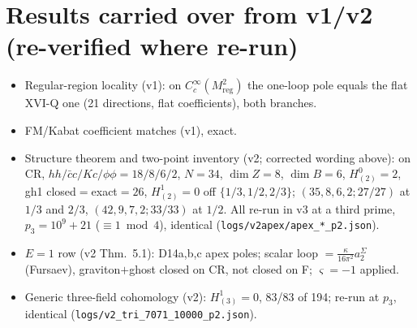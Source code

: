 \documentclass[11pt]{article}
\theoremstyle{definition}
\newcommand{\ka}{\kappa}
\newcommand{\Reg}{M_{\mathrm{reg}}}
\begin{document}
\section{Results carried over from v1/v2 (re-verified where re-run)}
\begin{itemize}
\item Regular-region locality (v1): on $C_c^\infty(\Reg^2)$ the one-loop pole equals the flat XVI-Q one (21 directions, flat coefficients), both branches.
\item FM/Kabat coefficient matches (v1), exact.
\item Structure theorem and two-point inventory (v2; corrected wording above): on CR, $hh/\bar cc/Kc/\phi\phi=18/8/6/2$, $N=34$, $\dim Z=8$, $\dim B=6$, $H^0_{(2)}=2$, gh1 closed$=$exact$=26$, $H^1_{(2)}=0$ off $\{1/3,1/2,2/3\}$; $(35,8,6,2;27/27)$ at $1/3$ and $2/3$, $(42,9,7,2;33/33)$ at $1/2$. All re-run in v3 at a third prime, $p_3=10^9+21$ ($\equiv1\bmod4$), identical (\texttt{logs/v2apex/apex\_*\_p2.json}).
\item $E=1$ row (v2 Thm.~5.1): D14a,b,c apex poles; scalar loop $=\frac{\ka}{16\pi^2}a_2^\Sigma$ (Fursaev), graviton$+$ghost closed on CR, not closed on F; $\varsigma=-1$ applied.
\item Generic three-field cohomology (v2): $H^1_{(3)}=0$, 83/83 of 194; re-run at $p_3$, identical (\texttt{logs/v2\_tri\_7071\_10000\_p2.json}).
\end{itemize}
\end{document}

